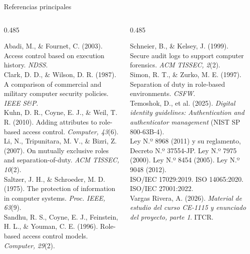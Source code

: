 \documentclass[aspectratio=169,t]{beamer}
\newcommand{\tCuatro}{\fontsize{13}{17.5}\selectfont}
\gdef\presentador{}
\newcommand{\quien}[1]{\gdef\presentador{#1}}
\begin{document}
\begin{frame}{Referencias principales}
\quien{}
\vspace{0.0in}
{\tCuatro
\begin{columns}[T,onlytextwidth]
\begin{column}{0.485\textwidth}
\raggedright
Abadi, M., \& Fournet, C. (2003). Access control based on execution history. \emph{NDSS}.\\[5pt]
Clark, D. D., \& Wilson, D. R. (1987). A comparison of commercial and military computer security
policies. \emph{IEEE S\&P}.\\[5pt]
Kuhn, D. R., Coyne, E. J., \& Weil, T. R. (2010). Adding attributes to role-based access control.
\emph{Computer, 43}(6).\\[5pt]
Li, N., Tripunitara, M. V., \& Bizri, Z. (2007). On mutually exclusive roles and separation-of-duty.
\emph{ACM TISSEC, 10}(2).\\[5pt]
Saltzer, J. H., \& Schroeder, M. D. (1975). The protection of information in computer systems.
\emph{Proc. IEEE, 63}(9).\\[5pt]
Sandhu, R. S., Coyne, E. J., Feinstein, H. L., \& Youman, C. E. (1996). Role-based access control
models. \emph{Computer, 29}(2).
\end{column}
\begin{column}{0.485\textwidth}
\raggedright
Schneier, B., \& Kelsey, J. (1999). Secure audit logs to support computer forensics. \emph{ACM
TISSEC, 2}(2).\\[5pt]
Simon, R. T., \& Zurko, M. E. (1997). Separation of duty in role-based environments. \emph{CSFW}.\\[5pt]
Temoshok, D., et al. (2025). \emph{Digital identity guidelines: Authentication and authenticator
management} (NIST SP 800-63B-4).\\[5pt]
Ley N.º 8968 (2011) y su reglamento, Decreto N.º 37554-JP. Ley N.º 7975 (2000). Ley N.º 8454
(2005). Ley N.º 9048 (2012).\\[5pt]
ISO/IEC 17029:2019. ISO 14065:2020. ISO/IEC 27001:2022.\\[5pt]
Vargas Rivera, A. (2026). \emph{Material de estudio del curso CE-1115 y enunciado del proyecto,
parte 1}. ITCR.
\end{column}
\end{columns}
}
\end{frame}
\end{document}
